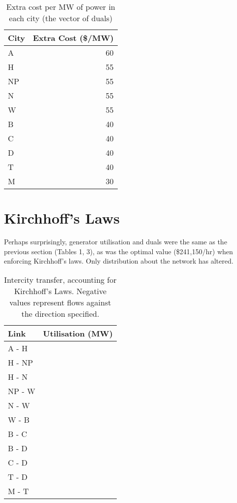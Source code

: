\documentclass[11pt]{article}
\begin{document}
\begin{table}[h]
	\centering
	\begin{tabular}{@{}lr@{}}
	\toprule
	City & Extra Cost (\$/MW) \\ \midrule
	A       & 60              \\
	H       & 55              \\
	NP      & 55              \\
	N       & 55              \\
	W       & 55              \\
	B       & 40              \\
	C       & 40              \\
	D       & 40              \\
	T       & 40              \\
	M       & 30              \\ \bottomrule
	\end{tabular}
	\caption{Extra cost per MW of power in each city (the vector of duals)}
\end{table}

\section{Kirchhoff's Laws}
Perhaps surprisingly, generator utilisation and duals were the same as the previous section (Tables 1, 3), as was the optimal value (\$241,150/hr) when enforcing Kirchhoff's laws. Only distribution about the network has altered.

\begin{table}[h]
	\centering
	\begin{tabular}{@{}lr@{}}
	\toprule
	Link & Utilisation (MW) \\ \midrule 
	A - H       & \color{red}{$-500$}           \\
	H - NP      & \color{red}{$-208.5$}         \\
	H - N       & \color{ForestGreen}{$71.5$}   \\
	NP - W      & \color{ForestGreen}{$67.5$}   \\
	N - W       & \color{red}{$-212.5$}         \\
	W - B       & \color{red}{$-1000$}          \\
	B - C       & \color{ForestGreen}{$292.2$}  \\
	B - D       & \color{red}{$-22.2$}          \\
	C - D       & \color{red}{$-785.8$}         \\
	T - D       & \color{ForestGreen}{$233$}    \\
	M - T       & \color{ForestGreen}{$850$}    \\ \bottomrule
	\end{tabular}
	\caption{Intercity transfer, accounting for Kirchhoff's Laws. Negative values represent flows against the direction specified.}
\end{table}
\end{document}
